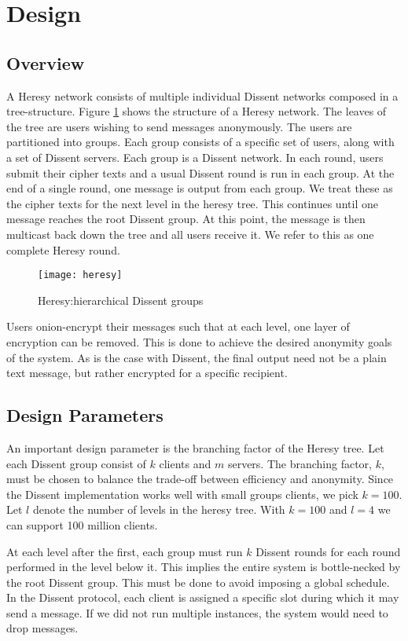 \section{Design}
\label{sec:Design}
\subsection{Overview}
A Heresy network consists of multiple individual Dissent networks composed in a tree-structure. Figure \ref{fig:heresy} shows the structure of a Heresy network. The leaves of the tree are users wishing to send messages anonymously. The users are partitioned into groups. Each group consists of a specific set of users, along with a set of Dissent servers. Each group is a Dissent network. In each round, users submit their cipher texts and a usual Dissent round is run in each group. At the end of a single round, one message is output from each group. We treat these as the cipher texts for the next level in the heresy tree. This continues until one message reaches the root Dissent group. At this point, the message is then multicast back down the tree and all users receive it. We refer to this as one complete Heresy round.

\begin{figure}
\centering
\texttt{[image: heresy]}
\caption{Heresy:hierarchical Dissent groups}
\label{fig:heresy}
\end{figure}

Users onion-encrypt their messages such that at each level, one layer of encryption can be removed. This is done to achieve the desired anonymity goals of the system. As is the case with Dissent, the final output need not be a plain text message, but rather encrypted for a specific recipient.

\subsection{Design Parameters}

An important design parameter is the branching factor of the Heresy tree. Let each Dissent group consist of $k$ clients and $m$ servers. The branching factor, $k$, must be chosen to balance the trade-off between efficiency and anonymity. Since the Dissent implementation works well with small groups clients, we pick $k=100$. Let $l$ denote the number of levels in the heresy tree. With $k=100$ and $l=4$ we can support 100 million clients.

At each level after the first, each group must run $k$ Dissent rounds for each round performed in the level below it. This implies the entire system is bottle-necked by the root Dissent group. This must be done to avoid imposing a global schedule. In the Dissent protocol, each client is assigned a specific slot during which it may send a message. If we did not run multiple instances, the system would need to drop messages. 


